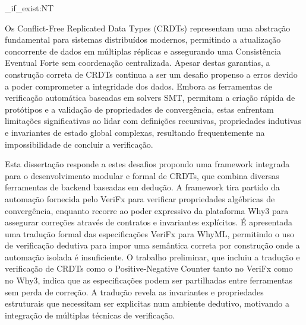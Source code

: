 
\ExplSyntaxOn
\cs_if_exist:NT \TitleOnHeader
  { \TitleOnHeader }
\ExplSyntaxOff

%

Os Conflict-Free Replicated Data Types (CRDTs) representam uma abstração fundamental para sistemas distribuídos modernos, permitindo a atualização concorrente de dados em múltiplas réplicas e assegurando uma Consistência Eventual Forte sem coordenação centralizada. Apesar destas garantias, a construção correta de CRDTs continua a ser um desafio propenso a erros devido a poder comprometer a integridade dos dados. Embora as ferramentas de verificação automática baseadas em solvers SMT, permitam a criação rápida de protótipos e a validação de propriedades de convergência, estas enfrentam limitações significativas ao lidar com definições recursivas, propriedades indutivas e invariantes de estado global complexas, resultando frequentemente na impossibilidade de concluir a verificação.

Esta dissertação responde a estes desafios propondo uma framework integrada para o desenvolvimento modular e formal de CRDTs, que combina diversas ferramentas de backend baseadas em dedução. A framework tira partido da automação fornecida pelo VeriFx para verificar propriedades algébricas de convergência, enquanto recorre ao poder expressivo da plataforma Why3 para assegurar correções através de contratos e invariantes explícitos. É apresentada uma tradução formal das especificações VeriFx para WhyML, permitindo o uso de verificação dedutiva para impor uma semântica correta por construção onde a automação isolada é insuficiente. O trabalho preliminar, que incluiu a tradução e verificação de CRDTs como o Positive-Negative Counter tanto no VeriFx como no Why3, indica que as especificações podem ser partilhadas entre ferramentas sem perda de correção. A tradução revela as invariantes e propriedades estruturais que necessitam ser explicitas num ambiente dedutivo, motivando a integração de múltiplas técnicas de verificação.

%
%

